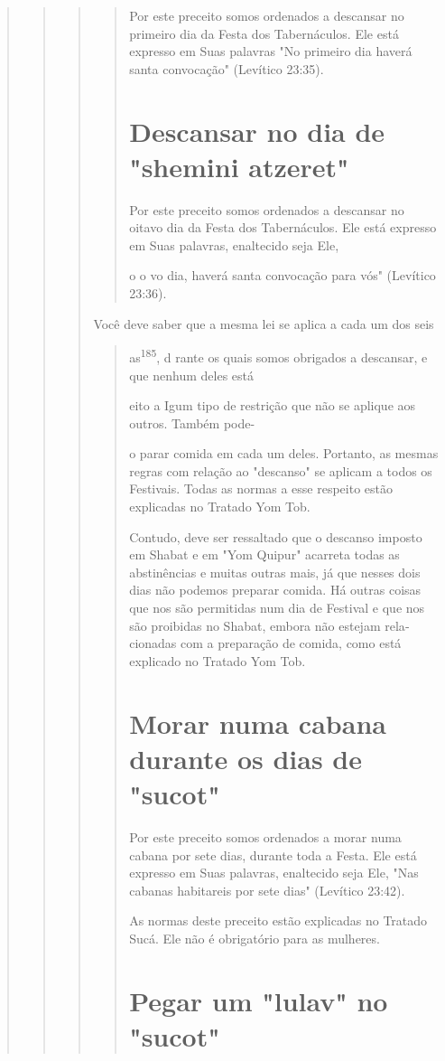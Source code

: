 \begin{quote}
\begin{quote}
\begin{quote}
\begin{quote}
Por este preceito somos ordenados a descansar no primeiro dia da Festa
dos Tabernáculos. Ele está expresso em Suas palavras "No primeiro dia
haverá santa convocação" (Levítico 23:35).

\section{Descansar no dia de "shemini atzeret"}

Por este preceito somos ordenados a descansar no oitavo dia da Fes­ta
dos Tabernáculos. Ele está expresso em Suas palavras, enaltecido seja
Ele,

o o vo dia, haverá santa convocação para vós" (Levítico 23:36).
\end{quote}

Você deve saber que a mesma lei se aplica a cada um dos seis

\begin{quote}
as\textsuperscript{185}, d rante os quais somos obrigados a descansar, e
que nenhum deles está

eito a Igum tipo de restrição que não se aplique aos outros. Também
pode-

o parar comida em cada um deles. Portanto, as mesmas regras com rela­ção
ao "descanso" se aplicam a todos os Festivais. Todas as normas a esse
res­peito estão explicadas no Tratado Yom Tob.

Contudo, deve ser ressaltado que o descanso imposto em Shabat e em "Yom
Quipur" acarreta todas as abstinências e muitas outras mais, já que
nesses dois dias não podemos preparar comida. Há outras coisas que nos
são permitidas num dia de Festival e que nos são proibidas no Shabat,
embora não estejam rela­cionadas com a preparação de comida, como está
explicado no Tratado Yom Tob.



\section{Morar numa cabana durante os dias de "sucot"}

Por este preceito somos ordenados a morar numa cabana por sete dias,
durante toda a Festa. Ele está expresso em Suas palavras, enaltecido
seja Ele, "Nas cabanas habitareis por sete dias" (Levítico 23:42).

As normas deste preceito estão explicadas no Tratado Sucá. Ele não é
obrigatório para as mulheres.

\section{Pegar um "lulav" no "sucot"}


\end{quote}
\end{quote}
\end{quote}
\end{quote}
